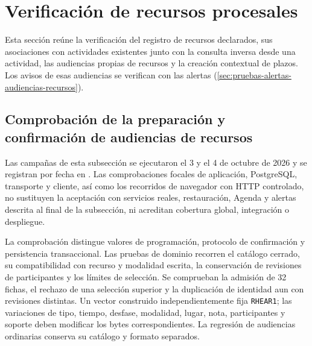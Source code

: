 
\section{Verificación de recursos procesales}\label{sec:pruebas-recursos}

Esta sección reúne la verificación del registro de recursos declarados, sus asociaciones con actividades existentes junto con la consulta inversa desde una actividad, las audiencias propias de recursos y la creación contextual de plazos. Los avisos de esas audiencias se verifican con las alertas (\cref{sec:pruebas-alertas-audiencias-recursos}).





\subsection{Comprobación de la preparación y confirmación de audiencias de recursos}\label{sec:pruebas-audiencias-recursos}

Las campañas de esta subsección se ejecutaron el 3 y el 4 de octubre de 2026 y se registran por fecha en . Las comprobaciones focales de aplicación, PostgreSQL, transporte y cliente, así como los recorridos de navegador con HTTP controlado, no sustituyen la aceptación con servicios reales, restauración, Agenda y alertas descrita al final de la subsección, ni acreditan cobertura global, integración o despliegue.

La comprobación distingue valores de programación, protocolo de confirmación y persistencia transaccional. Las pruebas de dominio recorren el catálogo cerrado, su compatibilidad con recurso y modalidad escrita, la conservación de revisiones de participantes y los límites de selección. Se comprueban la admisión de 32 fichas, el rechazo de una selección superior y la duplicación de identidad aun con revisiones distintas. Un vector construido independientemente fija \texttt{RHEAR1}; las variaciones de tipo, tiempo, desfase, modalidad, lugar, nota, participantes y soporte deben modificar los bytes correspondientes. La regresión de audiencias ordinarias conserva su catálogo y formato separados.

